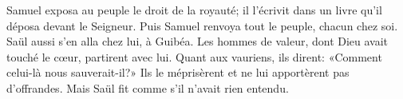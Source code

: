 Samuel exposa au peuple le droit de la royauté;
	il l’écrivit dans un livre qu’il déposa devant le Seigneur.
Puis Samuel renvoya tout le peuple, chacun chez soi.
Saül aussi s’en alla chez lui, à Guibéa.
	Les hommes de valeur, dont Dieu avait touché le cœur, partirent avec lui.
Quant aux vauriens, ils dirent:
	«Comment celui-là nous sauverait-il?»
Ils le méprisèrent et ne lui apportèrent pas d’offrandes.
	Mais Saül fit comme s’il n’avait rien entendu.
